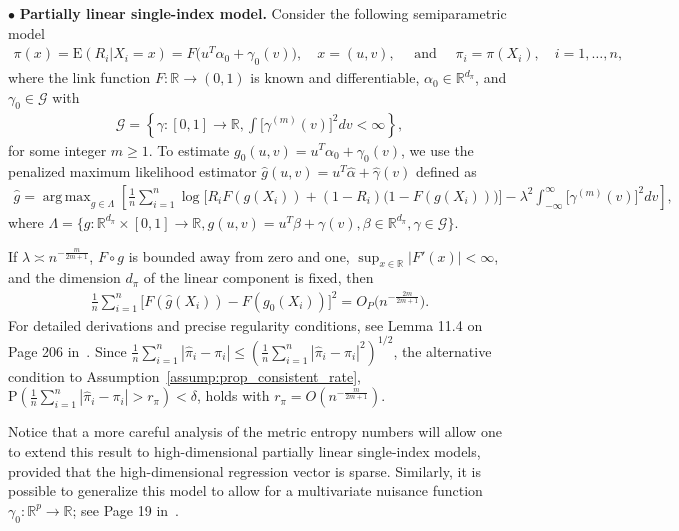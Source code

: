 \documentclass[ejsv2,noshowframe]{imsart}
\theoremstyle{plain}
\theoremstyle{definition}
\theoremstyle{remark}
\DeclareMathOperator*{\argmax}{arg\,max}
\renewcommand{\hat}{\widehat}
\begin{document}
$\bullet$  \textbf{Partially linear single-index model.} Consider the following semiparametric model 
\begin{align*}
	\pi(x) = \mathrm{E}(R_i|X_i = x) =  F\big(u^T\alpha_0 + \gamma_0(v) \big), \quad x = (u,v), \quad \text{ and } \quad \pi_i=\pi(X_i),\quad i = 1, \ldots, n,
\end{align*}
where the link function $F: \mathbb{R} \rightarrow (0,1)$ is known and differentiable, $\alpha_0 \in \mathbb{R}^{d_\pi}$, and $\gamma_0 \in \mathcal{G}$ with
\begin{align*}
	\mathcal{G} = \left\{ \gamma: [0,1] \rightarrow \mathbb{R},  \int \big[\gamma^{(m)}(v) \big]^2 dv < \infty \right\},
\end{align*}
for some integer $m \geq 1$.
To estimate $g_0(u,v) = u^T\alpha_0 + \gamma_0(v)$, we use the penalized maximum likelihood estimator $\hat{g}(u,v) = u^T\hat{\alpha} + \hat{\gamma}(v)$ defined as
\begin{align*}
	\hat{g} = \argmax_{ g \in \Lambda}  \left[\frac{1}{n} \sum_{i=1}^n  \log \big[ R_iF(g(X_i)) + (1 - R_i) \big(1- F(g(X_i))\big) \big] - \lambda^2\int_{-\infty}^\infty  \big[\gamma^{(m)}(v)\big]^2 dv \right],
\end{align*}
where $\Lambda = \{g : \mathbb{R}^{d_\pi} \times [0,1] \rightarrow \mathbb{R}, g(u,v) = u^T\beta + \gamma(v), \beta \in \mathbb{R}^{d_\pi}, \gamma \in \mathcal{G}\}$.

If $\lambda \asymp n^{-\frac{m}{2m+1}}$,  $F \circ g$ is bounded away from zero and one, $\sup_{x \in \mathbb{R}} |F'(x)| < \infty$, and the dimension $d_\pi$ of the linear component is fixed, then 
\begin{align*}
	\frac{1}{n}\sum_{i=1}^n \big[F(\hat{g}(X_i)) - F(g_0(X_i))\big]^2 = O_P\big(n^{-\frac{2m}{2m+1}} \big).
\end{align*}
For detailed derivations and precise regularity conditions, see Lemma 11.4 on Page 206 in~\cite{geer2000empirical}.
Since $\frac{1}{n}\sum_{i=1}^n\left|\hat{\pi}_i -\pi_i \right| \leq  \left(\frac{1}{n}\sum_{i=1}^n\left|\hat{\pi}_i -\pi_i \right|^2\right)^{1/2}$, the alternative condition to Assumption~\ref{assump:prop_consistent_rate}, $\mathrm{P}\left(\frac{1}{n}\sum_{i=1}^n \left|\hat{\pi}_i - \pi_i\right| > r_{\pi}\right) < \delta$, holds with $r_\pi = O\left(n^{-\frac{m}{2m+1}}\right)$.

Notice that a more careful analysis of the metric entropy numbers will allow one to extend this result to high-dimensional partially linear single-index models, provided that the high-dimensional regression vector is sparse. Similarly, it is possible to generalize this model to allow for a multivariate nuisance function $\gamma_0 : \mathbb{R}^{p} \rightarrow \mathbb{R}$; see Page 19 in~\cite{geer2000empirical}.
\end{document}
